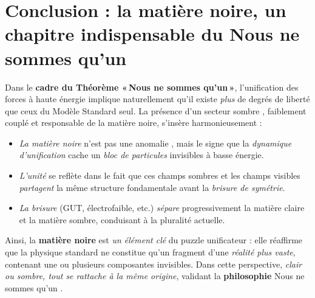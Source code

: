 \documentclass[12pt]{article}
\begin{document}
\section{Conclusion : la matière noire, un chapitre indispensable du \og Nous ne sommes qu’un \fg}
\label{sec:conclusion}

\noindent
Dans le \textbf{cadre du Théorème «\,Nous ne sommes qu’un\,»}, l’unification des forces à haute énergie implique naturellement qu’il existe \emph{plus} de degrés de liberté que ceux du Modèle Standard seul. La présence d’un \og secteur sombre \fg{}, faiblement couplé et responsable de la matière noire, s’insère harmonieusement :

\begin{itemize}
    \item \emph{La matière noire} n’est pas une \og anomalie \fg, mais le signe que la \emph{dynamique d’unification} cache un \emph{bloc de particules} invisibles à basse énergie.
    \item \emph{L’unité} se reflète dans le fait que ces champs sombres et les champs visibles \emph{partagent} la même structure fondamentale avant la \emph{brisure de symétrie}.
    \item \emph{La brisure} (GUT, électrofaible, etc.) \emph{sépare} progressivement la matière claire et la matière sombre, conduisant à la \og pluralité \fg{} actuelle.
\end{itemize}

Ainsi, la \textbf{matière noire} est \emph{un élément clé} du puzzle unificateur : elle \og réaffirme \fg{} que la physique standard ne constitue qu’un fragment d’une \emph{réalité plus vaste}, contenant une ou plusieurs composantes invisibles. Dans cette perspective, \emph{clair ou sombre, tout se rattache à la même origine}, validant la \textbf{philosophie} \og Nous ne sommes qu’un \fg.

\vspace{0.5cm}
\end{document}
